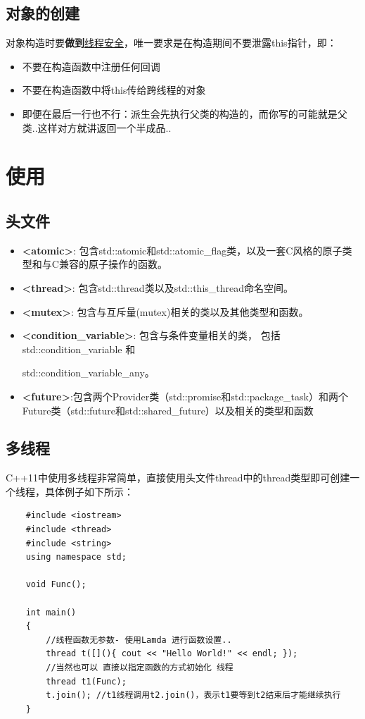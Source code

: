 \documentclass[UTF8,a4paper,12pt]{ctexbook}
\begin{document}
		\subsection{对象的创建}
			对象构造时要\textbf{做到}\underline{线程安全}，唯一要求是在构造期间不要泄露this指针，即：
				\begin{itemize}
					\item 不要在构造函数中注册任何回调
					\item 不要在构造函数中将this传给跨线程的对象
					\item 即便在最后一行也不行：派生会先执行父类的构造的，而你写的可能就是父类..这样对方就讲返回一个半成品..
				\end{itemize}
		
\section{使用}
	\subsection{头文件}
		\begin{itemize}
			\item \textbf{<atomic>}: 包含std::atomic和std::atomic\_flag类，以及一套C风格的原子类型和与C兼容的原子操作的函数。
			\item \textbf{<thread>}: 包含std::thread类以及std::this\_thread命名空间。
			\item \textbf{<mutex>}: 包含与互斥量(mutex)相关的类以及其他类型和函数。
			\item \textbf{<condition\_variable>}: 包含与条件变量相关的类， 包括std::condition\_variable 和
			
			 std::condition\_variable\_any。
			\item \textbf{<future>}:包含两个Provider类（std::promise和std::package\_task）和两个Future类（std::future和std::shared\_future）以及相关的类型和函数
		\end{itemize}
		
	\subsection{多线程}
		C++11中使用多线程非常简单，直接使用头文件thread中的thread类型即可创建一个线程，具体例子如下所示：
		\begin{lstlisting}
	#include <iostream>
	#include <thread>
	#include <string>
	using namespace std;
	
	void Func();
	
	int main()
	{
		//线程函数无参数- 使用Lamda 进行函数设置..
		thread t([](){ cout << "Hello World!" << endl; });
		//当然也可以 直接以指定函数的方式初始化 线程
		thread t1(Func);
		t.join(); //t1线程调用t2.join()，表示t1要等到t2结束后才能继续执行
	}
		\end{lstlisting}
		
\end{document}
